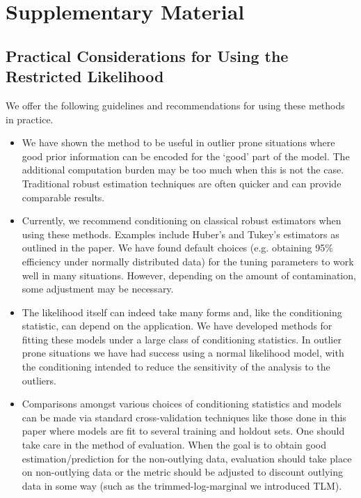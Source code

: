 \documentclass[ba]{imsart}
\begin{document}
\section{Supplementary Material}
\label{sec:appendix}

\subsection{Practical Considerations for Using the Restricted Likelihood}
We offer the following guidelines and recommendations for using these methods in practice. 
\begin{itemize}
\item We have shown the method to be useful in outlier prone situations where good prior information can be encoded for the `good' part of the model. The additional computation burden may be too much when this is not the case. Traditional robust estimation techniques are often quicker and can provide comparable results.
\item Currently, we recommend conditioning on classical robust estimators when using these methods. Examples include Huber's and Tukey's estimators as outlined in the paper. We have found default choices (e.g. obtaining 95\% efficiency under normally distributed data) for the tuning parameters to work well in many situations. However, depending on the amount of contamination, some adjustment may be necessary. 
\item The likelihood itself can indeed take many forms and, like the conditioning statistic, can depend on the application. We have developed methods for fitting these models under a large class of conditioning statistics. In outlier prone situations we have had success using a normal likelihood model, with the conditioning intended to reduce the sensitivity of the analysis to the outliers. 
\item Comparisons amongst various choices of conditioning statistics and models can be made via standard cross-validation techniques like those done in this paper where models are fit to several training and holdout sets. One should take care in the method of evaluation. When the goal is to obtain good estimation/prediction for the non-outlying data, evaluation should take place on non-outlying data or the metric should be adjusted to discount outlying data in some way (such as the trimmed-log-marginal we introduced TLM).
\end{itemize}

\end{document}
